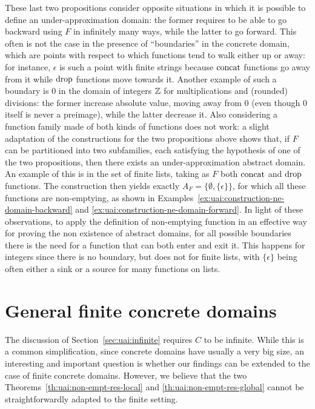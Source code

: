 These last two propositions consider opposite situations in which it is possible to define an under-approximation domain: the former requires to be able to go backward using $F$ in infinitely many ways, while the latter to go forward. This often is not the case in the presence of ``boundaries'' in the concrete domain, which are points with respect to which functions tend to walk either up or away: for instance, $\epsilon$ is such a point with finite strings because $\text{concat}$ functions go away from it while $\text{drop}$ functions move towards it.
Another example of such a boundary is $0$ in the domain of integers $\mathbb{Z}$ for multiplications and (rounded) divisions: the former increase absolute value, moving away from $0$ (even though $0$ itself is never a preimage), while the latter decrease it.
Also considering a function family made of both kinds of functions does not work: a slight adaptation of the constructions for the two propositions above shows that, if $F$ can be partitioned into two subfamilies, each satisfying the hypothesis of one of the two propositions, then there exists an under-approximation abstract domain. An example of this is in the set of finite lists, taking as $F$ both $\text{concat}$ and $\text{drop}$ functions. The construction then yields exactly $A_F = \{ \emptyset, \{ \epsilon \} \}$, for which all these functions are non-emptying, as shown in Examples~\ref{ex:uai:construction-ne-domain-backward} and \ref{ex:uai:construction-ne-domain-forward}.
In light of these observations, to apply the definition of non-emptying function in an effective way for proving the non existence of abstract domains, for all possible boundaries there is the need for a function that can both enter and exit it. This happens for integers since there is no boundary, but does not for finite lists, with $\{ \epsilon \}$ being often either a sink or a source for many functions on lists.

\section{General finite concrete domains}\label{sec:uai:finite}
The discussion of Section~\ref{sec:uai:infinite} requires $C$ to be infinite. While this is a common simplification, since concrete domains have usually a very big size, an interesting and important question is whether our findings can be extended to the case of finite concrete domains.
However, we believe that the two Theorems~\ref{th:uai:non-empt-res-local} and \ref{th:uai:non-empt-res-global} cannot be straightforwardly adapted to the finite setting.

